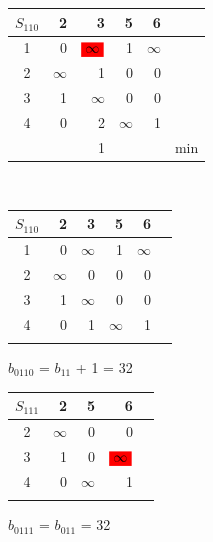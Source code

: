 \documentclass[12pt]{article}
\begin{document}
\begin{flushleft}
\begin{tabular}{c||rrrr||c}
$S_{110}$ & 2 & 3 & 5 & 6 & \\
\hline
\hline
1 &  0 & $\colorbox{red}{$\infty$}$  & 1 & $\infty$ & \\
2 &  $\infty$ & 1  & 0 & 0 & \\
3 &  1 & $\infty$  & 0 & 0 & \\
4 &  0 & 2  & $\infty$ & 1 & \\
\hline
\hline
 &  & 1 &  & & min \\
\end{tabular}
$\qquad $
\begin{tabular}{c||rrrr||c}
$S_{110}$ & 2 & 3 & 5 & 6 & \\
\hline
\hline
1 &  0 & $\infty$  & 1 & $\infty$ & \\
2 &  $\infty$ & 0  & 0 & 0 & \\
3 &  1 & $\infty$  & 0 & 0 & \\
4 &  0 & 1  & $\infty$ & 1 & \\
\hline
\hline
 &  &  &  & & \\
\end{tabular}
\end{flushleft}

$b_{0110}$ = $b_{11}$ + 1 = 32\\

\begin{flushleft}
\begin{tabular}{c||rrr||c}
    $S_{111}$ & 2  & 5 & 6 & \\
\hline
\hline
2 &  $\infty$   & 0 & 0 & \\
3 &  1   & 0 & $\colorbox{red}{$\infty$}$ & \\
4 &  0   & $\infty$ & 1 & \\
\hline
\hline
 &  &  &  & \\
\end{tabular}
\end{flushleft}

$b_{0111}$ = $b_{011}$ = 32\\
\end{document}
